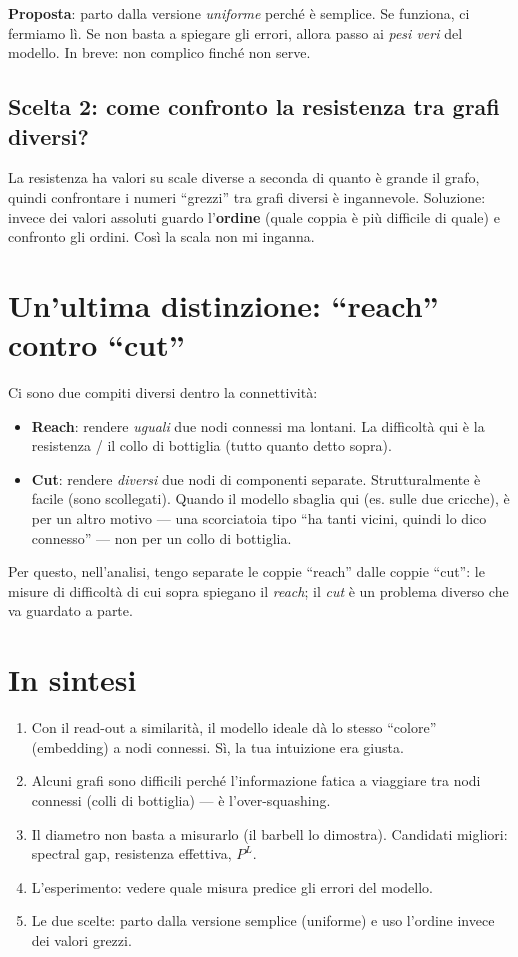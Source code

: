 \documentclass[11pt,a4paper]{article}
\begin{document}
\textbf{Proposta}: parto dalla versione \emph{uniforme} perché è semplice. Se
funziona, ci fermiamo lì. Se non basta a spiegare gli errori, allora passo ai
\emph{pesi veri} del modello. In breve: non complico finché non serve.

\subsection*{Scelta 2: come confronto la resistenza tra grafi diversi?}

La resistenza ha valori su scale diverse a seconda di quanto è grande il grafo,
quindi confrontare i numeri ``grezzi'' tra grafi diversi è ingannevole. Soluzione:
invece dei valori assoluti guardo l'\textbf{ordine} (quale coppia è più difficile
di quale) e confronto gli ordini. Così la scala non mi inganna.

\section{Un'ultima distinzione: ``reach'' contro ``cut''}

Ci sono due compiti diversi dentro la connettività:
\begin{itemize}
  \item \textbf{Reach}: rendere \emph{uguali} due nodi connessi ma lontani. La
        difficoltà qui è la resistenza / il collo di bottiglia (tutto quanto detto
        sopra).
  \item \textbf{Cut}: rendere \emph{diversi} due nodi di componenti separate.
        Strutturalmente è facile (sono scollegati). Quando il modello sbaglia qui
        (es. sulle due cricche), è per un altro motivo --- una scorciatoia tipo
        ``ha tanti vicini, quindi lo dico connesso'' --- non per un collo di
        bottiglia.
\end{itemize}
Per questo, nell'analisi, tengo separate le coppie ``reach'' dalle coppie ``cut'':
le misure di difficoltà di cui sopra spiegano il \emph{reach}; il \emph{cut} è un
problema diverso che va guardato a parte.

\section*{In sintesi}

\begin{enumerate}
  \item Con il read-out a similarità, il modello ideale dà lo stesso ``colore''
        (embedding) a nodi connessi. Sì, la tua intuizione era giusta.
  \item Alcuni grafi sono difficili perché l'informazione fatica a viaggiare tra
        nodi connessi (colli di bottiglia) --- è l'over-squashing.
  \item Il diametro non basta a misurarlo (il barbell lo dimostra). Candidati
        migliori: spectral gap, resistenza effettiva, $P^L$.
  \item L'esperimento: vedere quale misura predice gli errori del modello.
  \item Le due scelte: parto dalla versione semplice (uniforme) e uso l'ordine
        invece dei valori grezzi.
\end{enumerate}
\end{document}
